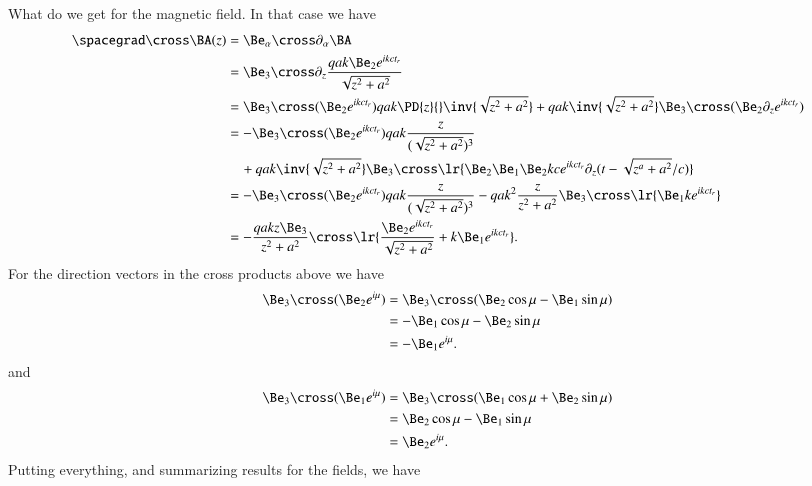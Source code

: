 {What do we get for the magnetic field.  In that case we have
%
\begin{equation}\label{eqn:relativisticElectrodynamicsExamReflection:1190}
\begin{aligned}
\spacegrad \cross \BA(z)
&=
\Be_\alpha \cross \partial_\alpha \BA \\
&=
\Be_3 \cross \partial_z \frac{q a k \Be_2 e^{i k c t_r} }{\sqrt{z^2 + a^2}}  \\
&=
\Be_3 \cross (\Be_2 e^{i  k c t_r} ) q a  k \PD{z}{} \inv{\sqrt{z^2 + a^2}}
+
q a  k \inv{\sqrt{z^2 + a^2}} \Be_3 \cross (\Be_2 \partial_z e^{i  k c t_r} ) \\
&=
-\Be_3 \cross (\Be_2 e^{i  k c t_r} ) q a  k \frac{z}{(\sqrt{z^2 + a^2})^3} \\
&\quad +
q a  k \inv{\sqrt{z^2 + a^2}} \Be_3 \cross 
\lr{
   \Be_2 \Be_1 \Be_2 k c e^{i  k c t_r} \partial_z ( t - \sqrt{z^a + a^2}/c ) 
}
\\
&=
-\Be_3 \cross (\Be_2 e^{i  k c t_r} ) q a  k \frac{z}{(\sqrt{z^2 + a^2})^3}
-
q a  k^2 \frac{z}{z^2 + a^2} \Be_3 \cross 
\lr{
   \Be_1 k e^{i  k c t_r} 
} \\
&=
-\frac{q a k z \Be_3}{z^2 + a^2} \cross 
\lr{
   \frac{ \Be_2 e^{i k c t_r} }{\sqrt{z^2 + a^2}} + k \Be_1 e^{i k c t_r}
}.
\end{aligned}
\end{equation}
%
For the direction vectors in the cross products above we have
%
\begin{equation}\label{eqn:relativisticElectrodynamicsExamReflection:1210}
\begin{aligned}
\Be_3 \cross (\Be_2 e^{i \mu})
&=
\Be_3 \cross (\Be_2 \cos\mu - \Be_1 \sin\mu) \\
&=
-\Be_1 \cos\mu - \Be_2 \sin\mu \\
&=
-\Be_1 e^{i \mu}.
\end{aligned}
\end{equation}
%
and
%
\begin{equation}\label{eqn:relativisticElectrodynamicsExamReflection:1230}
\begin{aligned}
\Be_3 \cross (\Be_1 e^{i \mu})
&=
\Be_3 \cross (\Be_1 \cos\mu + \Be_2 \sin\mu) \\
&=
\Be_2 \cos\mu - \Be_1 \sin\mu \\
&=
\Be_2 e^{i \mu}.
\end{aligned}
\end{equation}
%
Putting everything, and summarizing results for the fields, we have
%
\begin{equation}\label{eqn:relativisticElectrodynamicsExamReflection:250}

\end{equation}}
